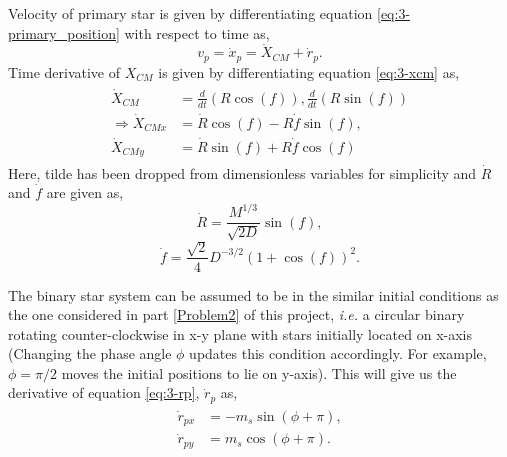 \documentclass[a4paper]{article}
\begin{document}
\begin{enumerate} [label*=\textbf{(\alph*)}]
					Velocity of primary star is given by differentiating equation \ref{eq:3-primary_position} with respect to time as,
					\begin{equation}
						v_p = \dot{x}_p = \dot{X}_{CM}^{} +\dot{r}_p.
						\label{eq:3-vp}
					\end{equation}
					Time derivative of \(X_{CM}^{}\) is given by differentiating equation \ref{eq:3-xcm} as,
					\begin{equation}
						\begin{gathered}
							\begin{aligned}
								\dot{X}_{CM}^{} &= \frac{d}{dt} (R \cos(f)), \frac{d}{dt} (R \sin(f)) \\
								\Rightarrow \dot{X}_{CMx} &= \dot{R} \cos(f) - R \dot{f} \sin(f), \\
								\dot{X}_{CMy} &= \dot{R} \sin(f) + R \dot{f} \cos(f)
							\end{aligned}
						\end{gathered}
						\label{eq:3-vcm}
					\end{equation}
					Here, tilde has been dropped from dimensionless variables for simplicity and \(\dot{R}\) and \(\dot{f}\) are given as,
					\begin{equation}
						\dot{R} = \frac{M^{1/3}}{\sqrt{2D}} \sin(f),
						\label{eq:3-rdot}
					\end{equation}
					\begin{equation}
						\dot{f} = \frac{\sqrt{2}}{4} D^{-3/2} \left( 1+\cos(f) \right)^2 .
						\label{eq:3-fdot}
					\end{equation}
					
					The binary star system can be assumed to be in the similar initial conditions as the one considered in part \ref{Problem2} of this project, \textit{i.e.} a circular binary rotating counter-clockwise in x-y plane with stars initially located on x-axis (Changing the phase angle \(\phi\) updates this condition accordingly. For example, \(\phi = \pi/2\) moves the initial positions to lie on y-axis). This will give us the derivative of equation \ref{eq:3-rp}, \(\dot{r}_p\) as,
					\begin{equation}
						\begin{gathered}
							\begin{aligned}
								\dot{r}_{px} &= -m_s \sin(\phi + \pi), \\
								\dot{r}_{py} &= m_s \cos(\phi + \pi).
							\end{aligned}
						\end{gathered} 
						\label{eq:3-vp_binary}
					\end{equation}
					

\end{enumerate}
\end{document}
